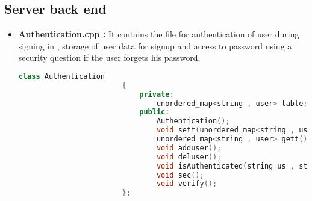 \documentclass{article}
\begin{document}
		\subsection{Server back end}
			\begin{itemize}
				\item \textbf{Authentication.cpp : } It contains the file for authentication of user during signing in , storage of user data for signup and access to password using a security question if the user forgets his password.
					\begin{lstlisting}[language=C++, caption={Header file of the class Authentication}]
						class Authentication
						{ 
							private:
								unordered_map<string , user> table;
							public:
								Authentication();
								void sett(unordered_map<string , user> tab);
								unordered_map<string , user> gett();
								void adduser();
								void deluser();
								void isAuthenticated(string us , string pass);
								void sec();
								void verify();
						};
					\end{lstlisting}
				

\end{itemize}
\end{document}
